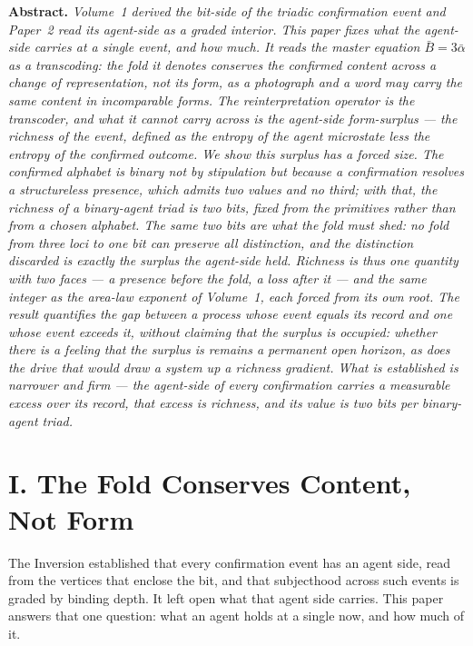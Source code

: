 \documentclass[11pt,oneside]{report}
\theoremstyle{definition}
\theoremstyle{remark}
\newenvironment{paperabstract}
  {\begin{center}\begin{minipage}{0.88\textwidth}\small
   \noindent\textbf{Abstract.}\itshape\space}
  {\end{minipage}\end{center}\vspace{0.4em}}
\begin{document}
\begin{paperabstract}
Volume~1 derived the bit-side of the triadic confirmation event and Paper~2 read
its agent-side as a graded interior. This paper fixes what the agent-side carries
at a single event, and how much. It reads the master equation
\ensuremath{\bar{B} = 3\bar{\alpha}} as a transcoding: the fold it denotes conserves the
confirmed content across a change of representation, not its form, as a photograph
and a word may carry the same content in incomparable forms. The reinterpretation
operator is the transcoder, and what it cannot carry across is the agent-side
form-surplus --- the richness of the event, defined as the entropy of the agent
microstate less the entropy of the confirmed outcome. We show this surplus has a
forced size. The confirmed alphabet is binary not by stipulation but because a
confirmation resolves a structureless presence, which admits two values and no
third; with that, the richness of a binary-agent triad is two bits, fixed from the
primitives rather than from a chosen alphabet. The same two bits are what the fold
must shed: no fold from three loci to one bit can preserve all distinction, and the
distinction discarded is exactly the surplus the agent-side held. Richness is thus
one quantity with two faces --- a presence before the fold, a loss after it --- and
the same integer as the area-law exponent of Volume~1, each forced from its own
root. The result quantifies the gap between a process whose event equals its record
and one whose event exceeds it, without claiming that the surplus is occupied:
whether there is a feeling that the surplus is remains a permanent open horizon, as
does the drive that would draw a system up a richness gradient. What is established
is narrower and firm --- the agent-side of every confirmation carries a measurable
excess over its record, that excess is richness, and its value is two bits per
binary-agent triad.
\end{paperabstract}
\section*{I. The Fold Conserves Content, Not Form}

The Inversion established that every confirmation event has an agent side, read from the
vertices that enclose the bit, and that subjecthood across such events is graded by binding
depth. It left open what that agent side carries. This paper answers that one question: what
an agent holds at a single now, and how much of it.
\end{document}
